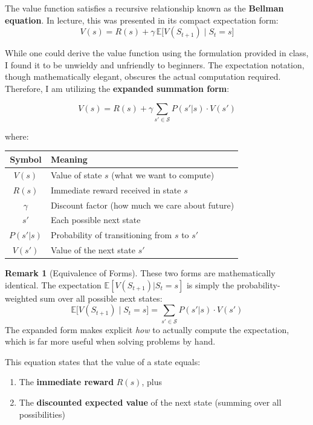 \documentclass[11pt]{article}
\theoremstyle{definition}
\newtheorem{remark}{Remark}
\begin{document}
The value function satisfies a recursive relationship known as the \textbf{Bellman equation}. In lecture, this was presented in its compact expectation form:
\[
V(s) = R(s) + \gamma \, \mathbb{E}\big[V(S_{t+1}) \mid S_t = s\big]
\]

While one could derive the value function using the formulation provided in class, I found it to be unwieldy and unfriendly to beginners. The expectation notation, though mathematically elegant, obscures the actual computation required. Therefore, I am utilizing the \textbf{expanded summation form}:

\[
\boxed{V(s) = R(s) + \gamma \sum_{s' \in \mathcal{S}} P(s'|s) \cdot V(s')}
\]

where:

\begin{center}
\begin{tabular}{c l}
\hline
\textbf{Symbol} & \textbf{Meaning} \\
\hline
$V(s)$ & Value of state $s$ (what we want to compute) \\
$R(s)$ & Immediate reward received in state $s$ \\
$\gamma$ & Discount factor (how much we care about future) \\
$s'$ & Each possible next state \\
$P(s'|s)$ & Probability of transitioning from $s$ to $s'$ \\
$V(s')$ & Value of the next state $s'$ \\
\hline
\end{tabular}
\end{center}

\begin{remark}[Equivalence of Forms]
These two forms are mathematically identical. The expectation $\mathbb{E}[V(S_{t+1}) | S_t = s]$ is simply the probability-weighted sum over all possible next states:
\[
\mathbb{E}\big[V(S_{t+1}) \mid S_t = s\big] = \sum_{s' \in \mathcal{S}} P(s'|s) \cdot V(s')
\]
The expanded form makes explicit \textit{how} to actually compute the expectation, which is far more useful when solving problems by hand.
\end{remark}

This equation states that the value of a state equals:
\begin{enumerate}
    \item The \textbf{immediate reward} $R(s)$, plus
    \item The \textbf{discounted expected value} of the next state (summing over all possibilities)
\end{enumerate}
\end{document}
